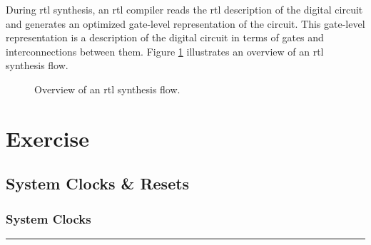 \documentclass[a4paper,11pt]{article}%
\begin{document}
During \ac{rtl} synthesis, an \ac{rtl} compiler reads the \ac{rtl} description of the digital circuit and generates an optimized gate-level representation of the circuit. This gate-level representation is a description of the digital circuit in terms of gates and interconnections between them. Figure \ref{fig:asic_flow} illustrates an overview of an \ac{rtl} synthesis flow.


\begin{figure}[H]
	\centering
	\caption{Overview of an \ac{rtl} synthesis flow.}
	\label{fig:asic_flow}
\end{figure}

\section{Exercise}

\subsection{System Clocks \& Resets}

\subsubsection{System Clocks}





\vfill
\hrule
\vspace{0.5cm}



\end{document}
